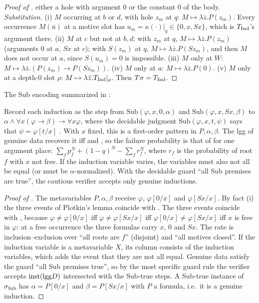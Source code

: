 \begin{proof}[Proof of ]
either a hole with argument $0$ or the constant $0$ of the body.
\emph{Substitution.} (i) $M$ occurring at $b$ or $d$, with hole $z_m$ at $q$: $M\mapsto\lambda\bar z.P(z_m)$. Every
occurrence $M(\bar u)$ at a motive slot has $u_m=\kappa(\cdot)|_q\in\{0,x,Sx\}$, which is $T_{\mathrm{Ind}}$'s argument there.
(ii) $M$ at $c$ but not at $b,d$: with $z_m$ at $q$, $M\mapsto\lambda\bar z.P(z_m)$ (arguments $0$ at $a$, $Sx$ at $c$);
with $S(z_m)$ at $q$, $M\mapsto\lambda\bar z.P(Sz_m)$, and then $M$ does not occur at $a$, since $S(u_m)=0$ is impossible.
(iii) $M$ only at $W$: $M\mapsto\lambda\bar z.(P(z_m)\to P(Sz_m))$. (iv) $M$ only at $a$: $M\mapsto\lambda\bar z.P(0)$.
(v) $M$ only at a depth-0 slot $\rho$: $M\mapsto\lambda\bar z.T_{\mathrm{Ind}}|_\rho$. Then $T\sigma=T_{\mathrm{Ind}}$.
\end{proof}

The Sub encoding summarized in :

\begin{proposition}\label{prop:zf:sub}
Record each induction as the step from $\mathrm{Sub}(\varphi,x,0,\alpha)$ and $\mathrm{Sub}(\varphi,x,Sx,\beta)$ to
$\alpha\wedge\forall x(\varphi\to\beta)\to\forall x\varphi$, where the decidable judgment $\mathrm{Sub}(\varphi,x,t,\psi)$
says that $\psi=\varphi[t/x]$ \citep{claude2026whatfollows}. With $x$ fixed, this is a first-order pattern in
$P,\alpha,\beta$. The lgg of genuine data recovers it iff \evR{} and \evN, so the failure probability is that of
 for one argument place: $\sum_f p_f^N+(1-q)^N-\sum_f r_f^N$, where $r_f$ is the probability of
root $f$ with $x$ not free. If the induction variable varies, the variables must also not all be equal (or must be
$\alpha$-normalized). With the decidable guard ``all Sub premises are true'', the cautious verifier accepts only genuine
inductions.
\end{proposition}

\begin{proof}[Proof of ]
The metavariables $P,\alpha,\beta$ receive $\varphi$, $\varphi[0/x]$ and $\varphi[Sx/x]$. By fact (i) the three \evR{}
events of Plotkin's lemma coincide with \evR. The three \evD{} events coincide with \evN, because
$\varphi\ne\varphi[0/x]$ iff $\varphi\ne\varphi[Sx/x]$ iff $\varphi[0/x]\ne\varphi[Sx/x]$ iff $x$ is free in $\varphi$: at a
free occurrence the three formulas carry $x$, $0$ and $Sx$. The rate is inclusion--exclusion over ``all roots are $f$''
(disjoint) and ``all motives closed''. If the induction variable is a metavariable $X$, its column consists of the
induction variables, which adds the event that they are not all equal. Genuine data satisfy the guard ``all Sub premises
true'', so by the most specific guard rule the verifier accepts $\mathrm{inst}(\mathrm{lgg} D)$ intersected with the Sub-true steps. A
Sub-true instance of $\sigma_{\mathrm{Sub}}$ has $\alpha=P[0/x]$ and $\beta=P[Sx/x]$ with $P$ a formula, i.e.\ it is a
genuine induction.
\end{proof}

